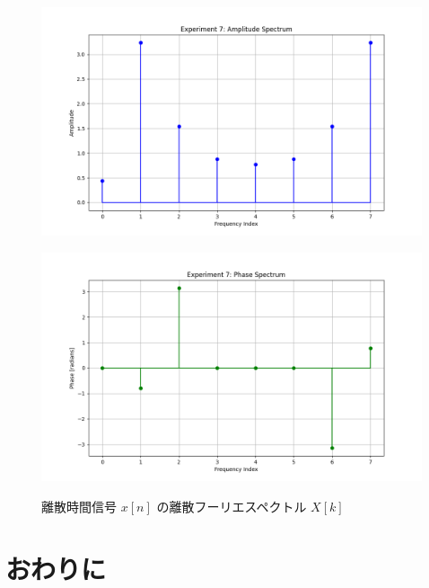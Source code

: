\documentclass[fleqn, a4paper. 12pt]{jsarticle}
\begin{document}
  \begin{figure}[h]
    \begin{center}
    \begin{minipage}[t]{0.48\columnwidth}
        \includegraphics[width=\columnwidth]{amplitude_spectrum_experiment_7.png}
        \label{fign:a7}
    \end{minipage}
    \begin{minipage}[t]{0.48\columnwidth}
        \includegraphics[width=\columnwidth]{phase_spectrum_experiment_7.png}
        \label{fign:p7}
    \end{minipage}
    \end{center}
    \caption{離散時間信号 $x[n]$ の離散フーリエスペクトル $X[k]$}
  \end{figure}

  \newpage

  \section*{おわりに}
\end{document}
